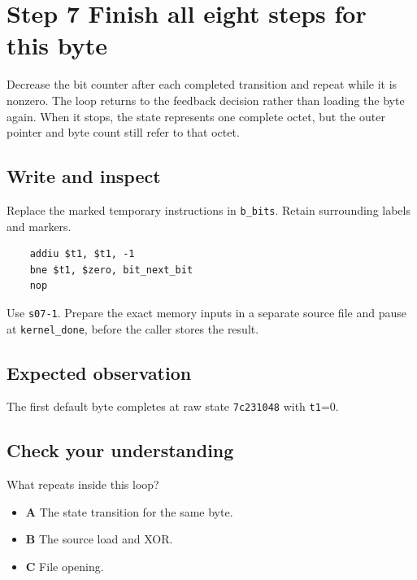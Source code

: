 \section{Step 7 Finish all eight steps for this byte}\label{crc-s07}

Decrease the bit counter after each completed transition and repeat while it is nonzero. The loop returns to the feedback decision rather than loading the byte again. When it stops, the state represents one complete octet, but the outer pointer and byte count still refer to that octet.

\subsection{Write and inspect}
Replace the marked temporary instructions in \texttt{b\_bits}. Retain surrounding labels and markers.

\begin{verbatim}
    addiu $t1, $t1, -1
    bne $t1, $zero, bit_next_bit
    nop
\end{verbatim}

Use \texttt{s07-1}. Prepare the exact memory inputs in a separate source file and pause at \texttt{kernel\_done}, before the caller stores the result.

\subsection{Expected observation}
The first default byte completes at raw state \texttt{7c231048} with \texttt{t1}=0.

\subsection{Check your understanding}
What repeats inside this loop?

\begin{itemize}
\item \textbf{A} The state transition for the same byte.
\item \textbf{B} The source load and XOR.
\item \textbf{C} File opening.
\end{itemize}
